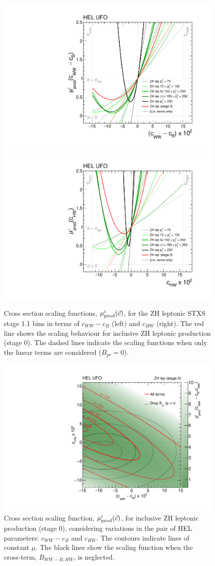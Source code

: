 \begin{figure}[htb!]
  \centering
  \includegraphics[width=.48\textwidth]{Figures/eft/scaling_functions/ZH_lep_vs_cWWMinuscB.pdf}
  \includegraphics[width=.48\textwidth]{Figures/eft/scaling_functions/ZH_lep_vs_cHW.pdf}
  \caption[HEL cross section scaling functions for ZH leptonic STXS bins]
  {
    Cross section scaling functions, $\mu_{\rm{prod}}^i(\vec{c})$, for the ZH leptonic STXS stage 1.1 bins in terms of $c_{WW}-c_B$ (left) and $c_{HW}$ (right). The red line shows the scaling behaviour for inclusive ZH leptonic production (stage 0). The dashed lines indicate the scaling functions when only the linear terms are considered ($B_{pr}=0$).
  }
  \label{fig:zhlep_sf_1d}
\end{figure}

\begin{figure}[htb!]
  \centering
  \includegraphics[width=.7\textwidth]{Figures/eft/scaling_functions/ZH_lep_cWWMinuscB_vs_cHW.pdf}
  \caption[Two dimensional HEL cross section scaling function for ZH leptonic STXS stage 0 bin]
  {
    Cross section scaling function, $\mu_{\rm{prod}}^i(\vec{c})$, for inclusive ZH leptonic production (stage 0), considering variations in the pair of HEL parameters: $c_{WW}-c_B$ and $c_{HW}$. The contours indicate lines of constant $\mu$. The black lines show the scaling function when the cross-term, $B_{WW-B,HW}$, is neglected.
  }
  \label{fig:zhlep_sf_2d}
\end{figure}

